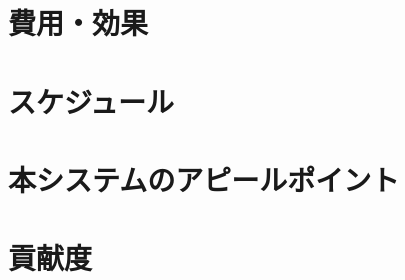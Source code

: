 \documentclass[a4paper, titlepage]{jsarticle}
\begin{document}
\section{費用・効果}

\section{スケジュール}

\section{本システムのアピールポイント}

\section{貢献度}
\end{document}

